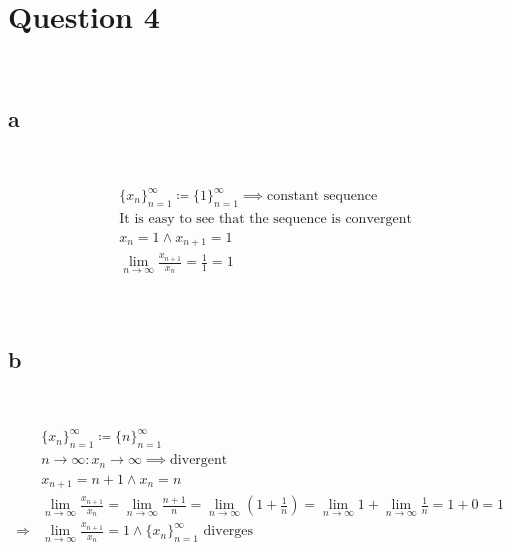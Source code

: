 \documentclass{article}
\begin{document}
\newpage

\section*{Question 4}

~

\subsection*{a}

~

\begin{align*}
    &\{x_n\}_{n=1}^\infty\coloneqq \{1\}_{n=1}^\infty\implies\text{constant sequence}\\
    &\text{It is easy to see that the sequence is convergent}\\
    &x_n=1\land x_{n+1}=1\\
    &\lim_{n\to\infty}{\frac{x_{n+1}}{x_n}}=\frac{1}{1}=1\\
\end{align*}

~

\subsection*{b}

~

\begin{align*}
    &\{x_n\}_{n=1}^\infty\coloneqq\{n\}_{n=1}^\infty\\
    &n\to\infty:x_n\to\infty\implies\text{divergent}\\
    &x_{n+1}=n+1\land x_n=n\\
    &\lim_{n\to\infty}\frac{x_{n+1}}{x_n}=\lim_{n\to\infty}\frac{n+1}{n}=\lim_{n\to\infty}(1+\frac{1}{n})=\lim_{n\to\infty}1+\lim_{n\to\infty}\frac{1}{n}=1+0=1\\
    \Rightarrow&\lim_{n\to\infty}\frac{x_{n+1}}{x_n}=1\land \{x_n\}_{n=1}^\infty\text{ diverges}\\
\end{align*}
\end{document}
